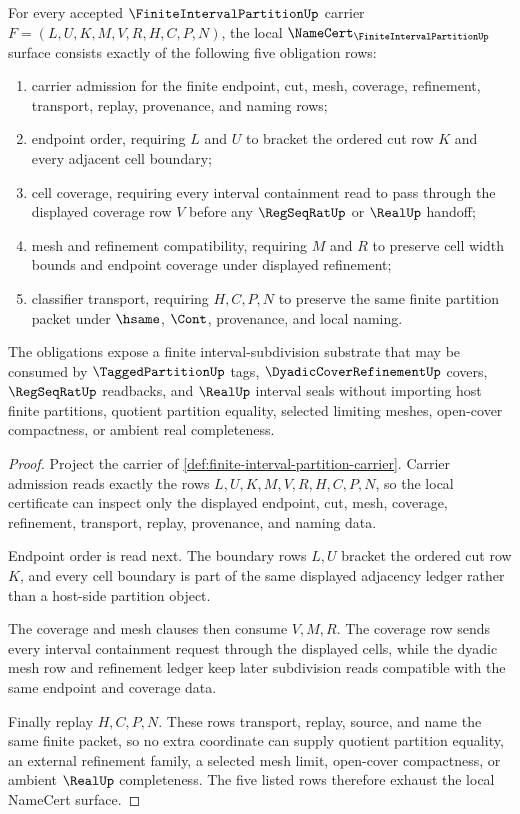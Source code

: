 \begin{theorem}
\label{thm:finite-interval-partition-namecert-obligations}
For every accepted $\FiniteIntervalPartitionUp$ carrier $F=(L,U,K,M,V,R,H,C,P,N)$, the local $\NameCert_{\FiniteIntervalPartitionUp}$ surface consists exactly of the following five obligation rows:
\begin{enumerate}
\item carrier admission for the finite endpoint, cut, mesh, coverage, refinement, transport, replay, provenance, and naming rows;
\item endpoint order, requiring $L$ and $U$ to bracket the ordered cut row $K$ and every adjacent cell boundary;
\item cell coverage, requiring every interval containment read to pass through the displayed coverage row $V$ before any $\RegSeqRatUp$ or $\RealUp$ handoff;
\item mesh and refinement compatibility, requiring $M$ and $R$ to preserve cell width bounds and endpoint coverage under displayed refinement;
\item classifier transport, requiring $H,C,P,N$ to preserve the same finite partition packet under $\hsame$, $\Cont$, provenance, and local naming.
\end{enumerate}
The obligations expose a finite interval-subdivision substrate that may be consumed by $\TaggedPartitionUp$ tags, $\DyadicCoverRefinementUp$ covers, $\RegSeqRatUp$ readbacks, and $\RealUp$ interval seals without importing host finite partitions, quotient partition equality, selected limiting meshes, open-cover compactness, or ambient real completeness.
\end{theorem}
\begin{proof}
Project the carrier of \autoref{def:finite-interval-partition-carrier}. Carrier admission reads exactly the rows $L,U,K,M,V,R,H,C,P,N$, so the local certificate can inspect only the displayed endpoint, cut, mesh, coverage, refinement, transport, replay, provenance, and naming data.

Endpoint order is read next. The boundary rows $L,U$ bracket the ordered cut row $K$, and every cell boundary is part of the same displayed adjacency ledger rather than a host-side partition object.

The coverage and mesh clauses then consume $V,M,R$. The coverage row sends every interval containment request through the displayed cells, while the dyadic mesh row and refinement ledger keep later subdivision reads compatible with the same endpoint and coverage data.

Finally replay $H,C,P,N$. These rows transport, replay, source, and name the same finite packet, so no extra coordinate can supply quotient partition equality, an external refinement family, a selected mesh limit, open-cover compactness, or ambient $\RealUp$ completeness. The five listed rows therefore exhaust the local NameCert surface.
\end{proof}

